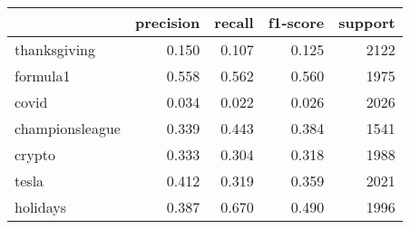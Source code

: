 \begin{tabular}{lrrrr}
\toprule
{} &  precision &  recall &  f1-score &  support \\
\midrule
thanksgiving    &      0.150 &   0.107 &     0.125 &     2122 \\
formula1        &      0.558 &   0.562 &     0.560 &     1975 \\
covid           &      0.034 &   0.022 &     0.026 &     2026 \\
championsleague &      0.339 &   0.443 &     0.384 &     1541 \\
crypto          &      0.333 &   0.304 &     0.318 &     1988 \\
tesla           &      0.412 &   0.319 &     0.359 &     2021 \\
holidays        &      0.387 &   0.670 &     0.490 &     1996 \\
\bottomrule
\end{tabular}
